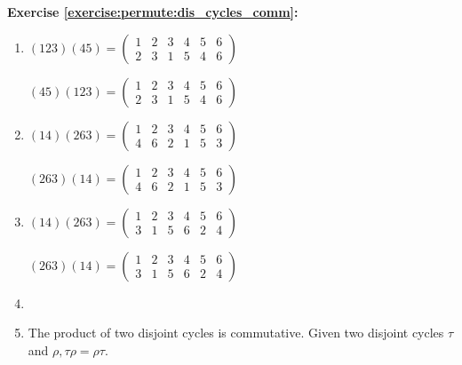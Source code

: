 \noindent\textbf{Exercise \ref{exercise:permute:dis_cycles_comm}:}  %
\begin{multicols}{2}
\begin{enumerate}[{a.}]
\item
$(123)(45) = \begin{pmatrix}
1 & 2 & 3 & 4 & 5 & 6\\
2 & 3 & 1 & 5 & 4 & 6
\end{pmatrix}$

$(45)(123) = \begin{pmatrix}
1 & 2 & 3 & 4 & 5 & 6\\
2 & 3 & 1 & 5 & 4 & 6
\end{pmatrix}$

\item
$(14)(263) = \begin{pmatrix}
1 & 2 & 3 & 4 & 5 & 6\\
4 & 6 & 2 & 1 & 5 & 3
\end{pmatrix}$

$(263)(14) = \begin{pmatrix}
1 & 2 & 3 & 4 & 5 & 6\\
4 & 6 & 2 & 1 & 5 & 3
\end{pmatrix}$

\item
$(14)(263) = \begin{pmatrix}
1 & 2 & 3 & 4 & 5 & 6\\
3 & 1 & 5 & 6 & 2 & 4
\end{pmatrix}$

$(263)(14) = \begin{pmatrix}
1 & 2 & 3 & 4 & 5 & 6\\
3 & 1 & 5 & 6 & 2 & 4
\end{pmatrix}$

\item

\item
The product of two disjoint cycles is commutative. Given two disjoint cycles $\tau$ and $\rho, \tau\rho = \rho\tau$.
\end{enumerate}
\end{multicols}

